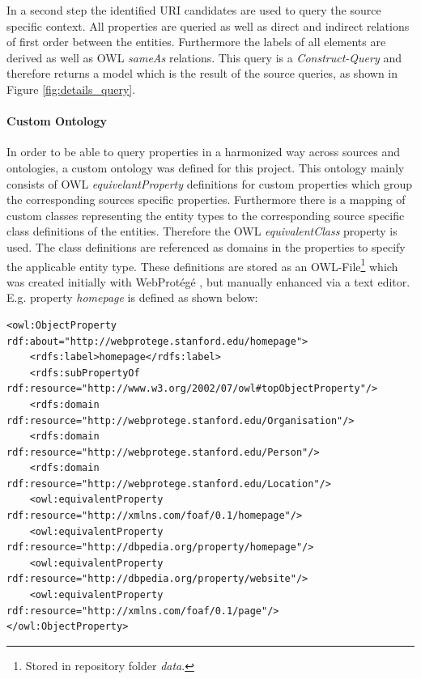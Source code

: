 In a second step the identified URI candidates are used to query the source specific context. All properties are queried as well as direct and indirect relations of first order between the entities. Furthermore the labels of all elements are derived as well as OWL \textit{sameAs} relations. 
This query is a \textit{Construct-Query} and therefore returns a model which is the result of the source queries, as shown in Figure \ref{fig:details_query}. 

\paragraph{Custom Ontology}
In order to be able to query properties in a harmonized way across sources and ontologies, a custom ontology was defined for this project. This  ontology mainly consists of OWL \textit{equivelantProperty} definitions for custom properties which group the corresponding sources specific properties. Furthermore there is a mapping of custom classes representing the entity types to the corresponding source specific class definitions of the entities. Therefore the OWL \textit{equivalentClass} property is used. The class definitions are referenced as domains in the properties to specify the applicable entity type. These definitions are stored as an OWL-File\footnote{Stored in repository folder \textit{data}.} which was created initially with WebProtégé \cite{stanford_university_webprotege_2016}, but manually enhanced via a text editor. E.g. property \textit{homepage} is defined as shown below:


\tiny
\begin{lstlisting}
<owl:ObjectProperty rdf:about="http://webprotege.stanford.edu/homepage">
	<rdfs:label>homepage</rdfs:label>
	<rdfs:subPropertyOf rdf:resource="http://www.w3.org/2002/07/owl#topObjectProperty"/>
	<rdfs:domain rdf:resource="http://webprotege.stanford.edu/Organisation"/>
	<rdfs:domain rdf:resource="http://webprotege.stanford.edu/Person"/>
	<rdfs:domain rdf:resource="http://webprotege.stanford.edu/Location"/>
	<owl:equivalentProperty rdf:resource="http://xmlns.com/foaf/0.1/homepage"/>
	<owl:equivalentProperty rdf:resource="http://dbpedia.org/property/homepage"/>
	<owl:equivalentProperty rdf:resource="http://dbpedia.org/property/website"/>
	<owl:equivalentProperty rdf:resource="http://xmlns.com/foaf/0.1/page"/>
</owl:ObjectProperty>
\end{lstlisting}
\normalsize



